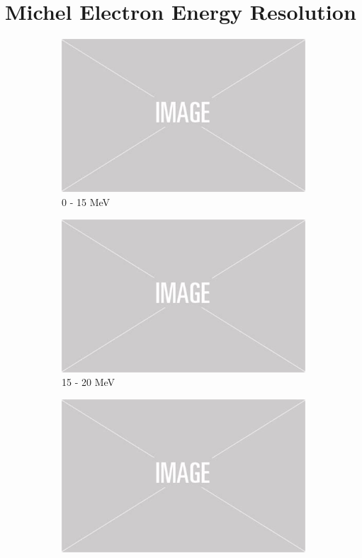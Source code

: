 \section{Michel Electron Energy Resolution}
\begin{figure}

	\centering
	\begin{subfigure}[b]{0.49\textwidth}
		\centering
		\includegraphics[width=\textwidth]{figures/placeholder.png}
		\caption {0 - 15 MeV}
	\end{subfigure}
	\hfill
	\begin{subfigure}[b]{0.49\textwidth}
		\centering
		\includegraphics[width=\textwidth]{figures/placeholder.png}
		\caption {15 - 20 MeV}
	\end{subfigure}
	\begin{subfigure}[b]{0.49\textwidth}
		\centering
		\includegraphics[width=\textwidth]{figures/placeholder.png}

\end{subfigure}
\end{figure}
